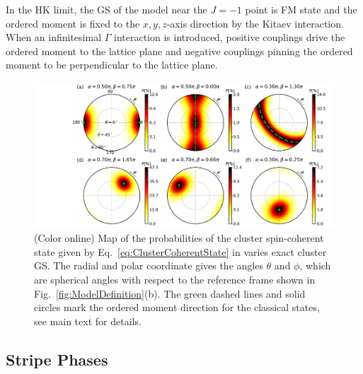 \documentclass[aps,prb,reprint,amsfonts,amsmath,amssymb,showpacs,groupedaddress,superscriptaddress]{revtex4-1}
\begin{document}
In the HK limit, the GS of the model near the $J=-1$ point is FM state and the ordered moment is fixed to the $x,y,z$-axis direction by the Kitaev interaction. When an infinitesimal $\Gamma$ interaction is introduced, positive couplings drive the ordered moment to the lattice plane and negative couplings pinning the ordered moment to be perpendicular to the lattice plane.

\begin{figure}
    \centering
    \includegraphics[width=\columnwidth]{fig/Probabilities.pdf}
    \caption{\label{fig:Proabilities}(Color online) Map of the probabilities of the cluster spin-coherent state given by Eq.~\eqref{eq:ClusterCoherentState} in varies exact cluster GS. The radial and polar coordinate gives the angles $\theta$ and $\phi$, which are spherical angles with respect to the reference frame shown in Fig.~\ref{fig:ModelDefinition}(b). The green dashed lines and solid circles mark the ordered moment direction for the classical states, see main text for details.}
\end{figure}

\subsection{\label{subsec:StripePhases}Stripe Phases}
\end{document}
